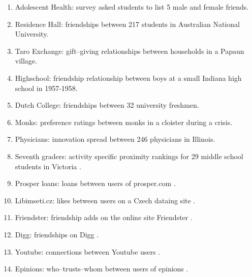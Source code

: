 \documentclass[3p,times]{elsarticle}
\begin{document}
\begin{enumerate}


    	
    	\item Adolescent Health: survey asked students to list 5 male and female friends. \cite{AdHealth}
    	
    	\item Residence Hall: friendships between 217 students in Australian National University. \cite{Res}
    	
    	\item Taro Exchange: gift--giving relationships between households in a Papaun village. \cite{Taro}
    	
    	\item Highschool: friendship relationship between boys at a small Indiana high school in 1957-1958. \cite{HS}
    	
    	\item Dutch College: friendships between 32 university freshmen. \cite{Dutch}
    	
    	\item Monks: preference ratings between monks in a cloister during a crisis. \cite{monks}
    	
    	\item Physicians: innovation spread between 246 physicians in Illinois. \cite{docs}
    	
    	\item Seventh graders: activity specific proximity rankings for 29 middle school students in Victoria \cite{sevies}.
    
    \item Prosper loans: loans between users of prosper.com \cite{prosper}.
    
    \item Libimseti.cz: likes between users on a Czech dataing site \cite{libi}.
    
    \item Friendster: friendship adds on the online site Friendster \cite{friendster}.
    
    \item Digg: friendships on Digg \cite{digg}.
    
    \item Youtube: connections between Youtube users \cite{youtube}.
    
    \item Epinions: who--trusts--whom between users of epinions \cite{epinions}.
  

\end{enumerate}
\end{document}
